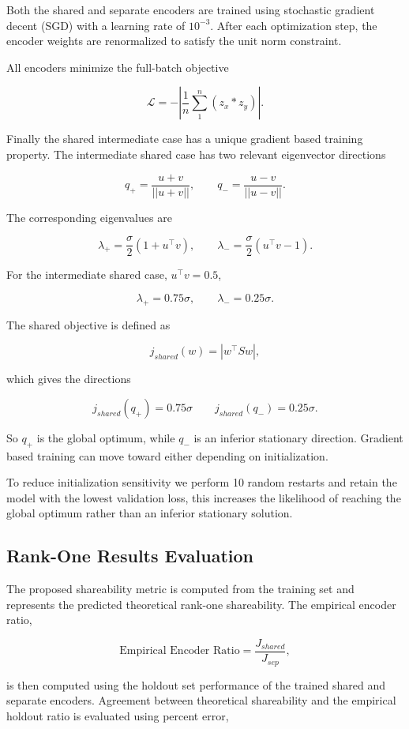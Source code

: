 \documentclass{article}
\begin{document}
Both the shared and separate encoders are trained using stochastic gradient decent (SGD) with a learning rate of \(10^{-3}\). After each optimization step, the encoder weights are renormalized to satisfy the unit norm constraint. 

All encoders minimize the full-batch objective

\[
\mathcal{L} = -|\frac{1}{n}\sum_1^n (z_x * z_y)|.
\]


Finally the shared intermediate case has a unique gradient based training property. The intermediate shared case has two relevant eigenvector directions

\[
q_+ = \frac{u+v}{||u+v||}, \qquad q_- = \frac{u-v}{||u-v||}.
\]

The corresponding eigenvalues are 

\[
\lambda_+ = \frac{\sigma}{2}(1 + u^\top v),\qquad \lambda_- = \frac{\sigma}{2} (u^\top v - 1).
\]

For the intermediate shared case, \(u^\top v = 0.5\),

\[
\lambda_+ = 0.75\sigma, \qquad \lambda_- = 0.25\sigma.
\]

The shared objective is defined as 

\[
j_{shared}(w) = |w^\top S w|,
\]

which gives the directions 

\[
j_{shared}(q_+) = 0.75\sigma \qquad j_{shared}(q_-) =0.25\sigma.
\]

So \(q_+\) is the global optimum, while \(q_-\) is an inferior stationary direction. Gradient based training can move toward either depending on initialization.

To reduce initialization sensitivity we perform 10 random restarts and retain the model with the lowest validation loss, this increases the likelihood of reaching the global optimum rather than an inferior stationary solution.

\subsection{Rank-One Results Evaluation}

The proposed shareability metric is computed from the training set and represents the predicted theoretical rank-one shareability. The empirical encoder ratio,

\[
\text{Empirical Encoder Ratio} = \frac{J_{shared}}{J_{sep}},
\]

is then computed using the holdout set performance of the trained shared and separate encoders. Agreement between theoretical shareability and the empirical holdout ratio is evaluated using percent error, 
\end{document}

